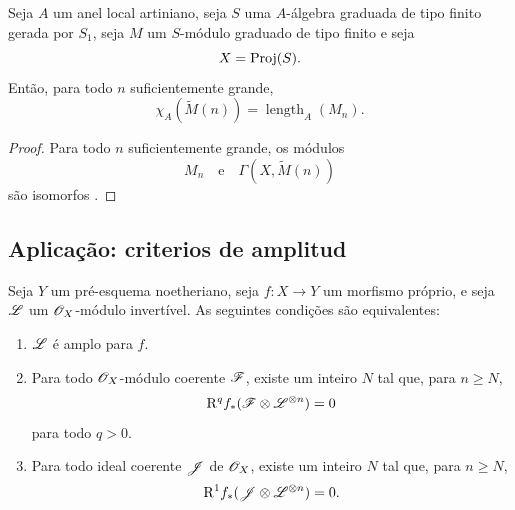 \begin{corollary}[2.5.4]
\label{III.2.5.4}
Seja $A$ um anel local artiniano, seja $S$ uma $A$-álgebra graduada de tipo finito gerada por $S_1$, seja $M$ um $S$-módulo graduado de tipo finito e seja
\[
  X=\operatorname{Proj}(S).
\]
Então, para todo $n$ suficientemente grande,
\[
  \chi_A(\widetilde{M}(n))
  =
  \operatorname{length}_A(M_n).
\]
\end{corollary}

\begin{proof}
Para todo $n$ suficientemente grande, os módulos
\[
  M_n
  \quad\text{e}\quad
  \Gamma(X,\widetilde{M}(n))
\]
são isomorfos .
\end{proof}


\subsection{Aplicação: criterios de amplitud}
\label{subsection:III.2.6}

\begin{proposition}[2.6.1]
\label{III.2.6.1}
Seja $Y$ um pré-esquema noetheriano, seja $f:X\to Y$ um morfismo próprio,
e seja $\mathscr{L}$ um $\mathscr{O}_X$-módulo invertível.
As seguintes condições são equivalentes:
\begin{enumerate}
  \item[\emph{a) }] $\mathscr{L}$ é amplo para $f$.
  \item[\emph{b)}] Para todo $\mathscr{O}_X$-módulo coerente $\mathscr{F}$, existe
  um inteiro $N$ tal que, para $n\geq N$,
  \[
    \mathrm{R}^qf_*(\mathscr{F}\otimes\mathscr{L}^{\otimes n})=0
  \]
  para todo $q>0$.
  \item[\emph{c)}] Para todo ideal coerente $\mathscr{J}$ de $\mathscr{O}_X$, existe
  um inteiro $N$ tal que, para $n\geq N$,
  \[
    \mathrm{R}^1f_*(\mathscr{J}\otimes\mathscr{L}^{\otimes n})=0.
  \]
\end{enumerate}
\end{proposition}


